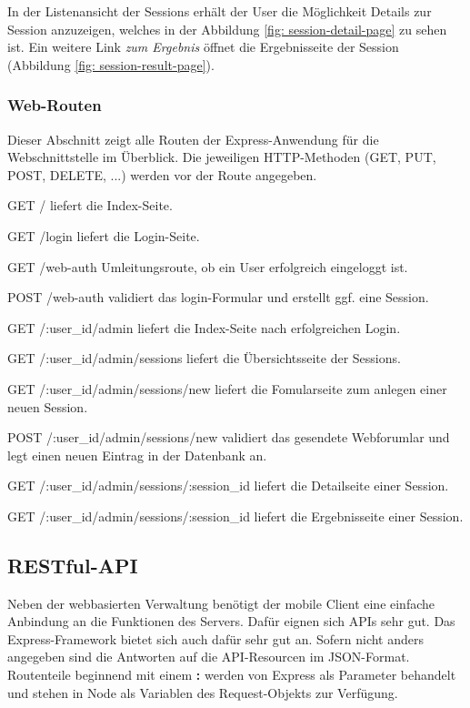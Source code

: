 In der Listenansicht der Sessions erhält der User die Möglichkeit Details zur Session anzuzeigen, welches in der Abbildung \ref{fig: session-detail-page} zu sehen ist. 
Ein weitere Link \emph{zum Ergebnis} öffnet die Ergebnisseite der Session (Abbildung \ref{fig: session-result-page}).

\subsubsection{Web-Routen}

Dieser Abschnitt zeigt alle Routen der Express-Anwendung für die Webschnittstelle im Überblick. 
Die jeweiligen \ac{HTTP}-Methoden (GET, PUT, POST, DELETE, ...) werden vor der Route angegeben.

\begin{compactdesc}

	\item[GET /] liefert die Index-Seite.
	\item[GET /login] liefert die Login-Seite.

	\item[GET /web-auth] Umleitungsroute, ob ein User erfolgreich eingeloggt ist.
	\item[POST /web-auth] validiert das login-Formular und erstellt ggf. eine Session.
	\item[GET /:user\_id/admin] liefert die Index-Seite nach erfolgreichen Login.
	\item[GET /:user\_id/admin/sessions] liefert die Übersichtsseite der Sessions.
	\item[GET /:user\_id/admin/sessions/new] liefert die Fomularseite zum anlegen einer neuen Session.
	\item[POST /:user\_id/admin/sessions/new] validiert das gesendete Webforumlar und legt einen neuen Eintrag in der Datenbank an.
	\item[GET /:user\_id/admin/sessions/:session\_id] liefert die Detailseite einer Session.
	\item[GET /:user\_id/admin/sessions/:session\_id] liefert die Ergebnisseite einer Session.
	
	
\end{compactdesc}

\pagebreak

\subsection{RESTful-API \label{sec: api}}

Neben der webbasierten Verwaltung benötigt der mobile Client eine einfache Anbindung an die Funktionen des Servers. 
Dafür eignen sich \ac{API}s sehr gut. 
Das Express-Framework bietet sich auch dafür sehr gut an. 
Sofern nicht anders angegeben sind die Antworten auf die \ac{API}-Resourcen im \ac{JSON}-Format. 
Routenteile beginnend mit einem \textbf{:} werden von Express als Parameter behandelt und stehen in Node als Variablen des Request-Objekts zur Verfügung. 


